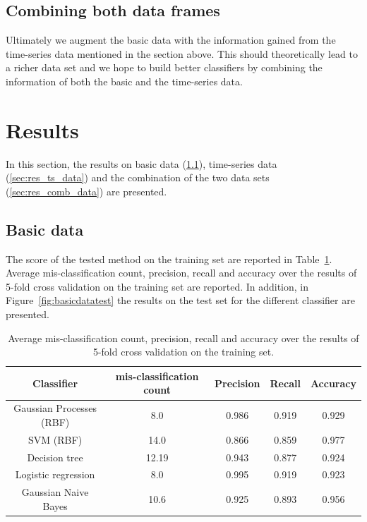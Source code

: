 \documentclass[a4paper,11pt]{article}
\begin{document}
\subsection{Combining both data frames}

Ultimately we augment the basic data with the information gained from the time-series data mentioned in the section above. This should theoretically lead to a richer data set and we hope to build better classifiers by combining the information of both the basic and the time-series data.

\section{Results}
In this section, the results on basic data (\ref{sec:res_basic_data}), time-series data (\ref{sec:res_ts_data}) and the combination of the two data sets (\ref{sec:res_comb_data}) are presented.

\subsection{Basic data}\label{sec:res_basic_data}
The score of the tested method on the training set are reported in Table~\ref{tab:basicdatascores}. Average mis-classification count, precision, recall and accuracy over the results of 5-fold cross validation on the training set are reported. In addition, in Figure~\ref{fig:basicdatatest} the results on the test set for the different classifier are presented.

\begin{table}[H]
    \centering
    \begin{tabular}{|c|c|c|c|c|}
    \hline
        Classifier & mis-classification count & Precision & Recall & Accuracy \\
    \hline
        Gaussian Processes (RBF)& 8.0   & 0.986 & 0.919 & 0.929\\
        SVM (RBF)               & 14.0  & 0.866 & 0.859 & 0.977\\
        Decision tree           & 12.19 & 0.943 & 0.877 & 0.924\\
        Logistic regression     & 8.0   & 0.995 & 0.919 & 0.923\\
        Gaussian Naive Bayes    & 10.6  & 0.925 & 0.893 & 0.956\\
    \hline
    \end{tabular}
    \caption{Average mis-classification count, precision, recall and accuracy over the results of 5-fold cross validation on the training set.}
    \label{tab:basicdatascores}
\end{table}
\end{document}
